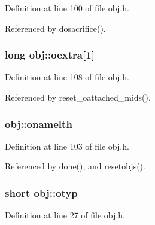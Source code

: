 Definition at line 100 of file obj.\+h.



Referenced by dosacrifice().

\hypertarget{structobj_aba8aff131c3bf3f9bc24949072de3cac}{
\subsubsection[{oextra}]{\setlength{\rightskip}{0pt plus 5cm}long obj\+::oextra\mbox{[}1\mbox{]}}}\label{structobj_aba8aff131c3bf3f9bc24949072de3cac}


Definition at line 108 of file obj.\+h.



Referenced by reset\+\_\+oattached\+\_\+mids().

\hypertarget{structobj_a032663f21fa617948660e1102147b47d}{
\subsubsection[{onamelth}]{ obj\+::onamelth}}\label{structobj_a032663f21fa617948660e1102147b47d}


Definition at line 103 of file obj.\+h.



Referenced by done(), and resetobjs().

\hypertarget{structobj_a95eb282afebd3599996035e8aab71751}{
\subsubsection[{otyp}]{\setlength{\rightskip}{0pt plus 5cm}short obj\+::otyp}}\label{structobj_a95eb282afebd3599996035e8aab71751}


Definition at line 27 of file obj.\+h.



